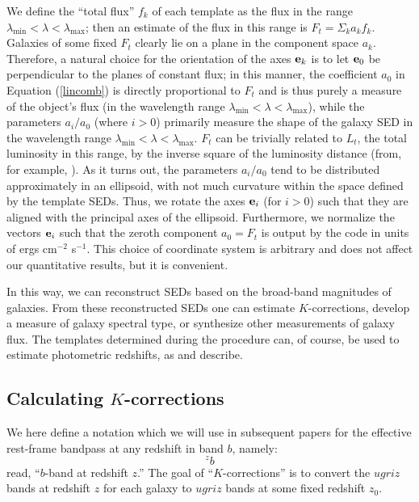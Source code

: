 \documentclass[10pt,preprint]{aastex}
\newcommand{\vv}[1]{{\bf #1}}
\newcommand{\band}[2]{\ensuremath{^{#1}{#2}}}
\begin{document}
We define the ``total flux'' $f_k$ of each template as the flux in the
range $\lambda_{\mathrm{min}}<\lambda<\lambda_{\mathrm{max}}$; then an
estimate of the flux in this range is $F_{{t}}=\Sigma_k a_k f_k$.
Galaxies of some fixed $F_t$ clearly lie on a plane in the component
space $a_k$. Therefore, a natural choice for the orientation of the
axes $\vv{e}_k$ is to let $\vv{e}_0$ be perpendicular to the planes of
constant flux; in this manner, the coefficient $a_0$ in Equation
(\ref{lincomb}) is directly proportional to $F_t$ and is thus purely a
measure of the object's flux (in the wavelength range
$\lambda_{\mathrm{min}} <\lambda < \lambda_{\mathrm{max}}$), while the
parameters $a_i/a_0$ (where $i>0$) primarily measure the shape of the
galaxy SED in the wavelength range $\lambda_{\mathrm{min}} <\lambda <
\lambda_{\mathrm{max}}$. $F_t$ can be trivially related to $L_t$, the
total luminosity in this range, by the inverse square of the
luminosity distance (from, for example, \citealt{hogg99a}).  As it
turns out, the parameters $a_i/a_0$ tend to be distributed
approximately in an ellipsoid, with not much curvature within the
space defined by the template SEDs. Thus, we rotate the axes
$\vv{e}_i$ (for $i>0$) such that they are aligned with the principal
axes of the ellipsoid. Furthermore, we normalize the vectors
$\vv{e}_i$ such that the zeroth component $a_0=F_t$ is output by the
code in units of ergs cm$^{-2}$ s$^{-1}$. This choice of coordinate
system is arbitrary and does not affect our quantitative results, but
it is convenient.

In this way, we can reconstruct SEDs based on the broad-band
magnitudes of galaxies. From these reconstructed SEDs one can estimate
$K$-corrections, develop a measure of galaxy spectral type, or
synthesize other measurements of galaxy flux.  The templates
determined during the procedure can, of course, be used to estimate
photometric redshifts, as \citet{csabai00a} and \citet{budavari00a}
describe.

\subsection{Calculating $K$-corrections}

We here define a notation which we will use in subsequent papers for
the effective rest-frame bandpass at any redshift in band $b$, namely:
\begin{equation}
\band{z}{b}
\end{equation}
read, ``$b$-band at redshift $z$.'' The goal of ``$K$-corrections'' is
to convert the $ugriz$ bands at redshift $z$ for each galaxy to
$ugriz$ bands at some fixed redshift $z_0$.
\end{document}
